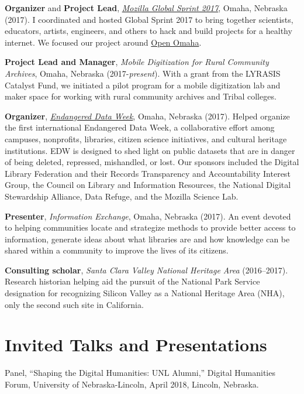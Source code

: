 \textbf{Organizer} and \textbf{Project Lead},
\emph{\href{https://mozilla.github.io/global-sprint/}{Mozilla Global
Sprint 2017}}, Omaha, Nebraska (2017). I coordinated and hosted Global
Sprint 2017 to bring together scientists, educators, artists, engineers,
and others to hack and build projects for a healthy internet. We focused
our project around \href{http://github.com/open-omaha/}{Open Omaha}.

\textbf{Project Lead and Manager}, \emph{Mobile Digitization for Rural
Community Archives}, Omaha, Nebraska (2017-\emph{present}). With a grant
from the LYRASIS Catalyst Fund, we initiated a pilot program for a
mobile digitization lab and maker space for working with rural community
archives and Tribal colleges.

\textbf{Organizer},
\emph{\href{http://endangereddataweek.org}{Endangered Data Week}},
Omaha, Nebraska (2017). Helped organize the first international
Endangered Data Week, a collaborative effort among campuses, nonprofits,
libraries, citizen science initiatives, and cultural heritage
institutions. EDW is designed to shed light on public datasets that are
in danger of being deleted, repressed, mishandled, or lost. Our sponsors
included the Digital Library Federation and their Records Transparency
and Accountability Interest Group, the Council on Library and
Information Resources, the National Digital Stewardship Alliance, Data
Refuge, and the Mozilla Science Lab.

\textbf{Presenter}, \emph{Information Exchange}, Omaha, Nebraska (2017).
An event devoted to helping communities locate and strategize methods to
provide better access to information, generate ideas about what
libraries are and how knowledge can be shared within a community to
improve the lives of its citizens.

\textbf{Consulting scholar}, \emph{Santa Clara Valley National Heritage
Area} (2016--2017). Research historian helping aid the pursuit of the
National Park Service designation for recognizing Silicon Valley as a
National Heritage Area (NHA), only the second such site in California.

\section{Invited Talks and
Presentations}\label{invited-talks-and-presentations}

Panel, ``Shaping the Digital Humanities: UNL Alumni,'' Digital
Humanities Forum, University of Nebraska-Lincoln, April 2018, Lincoln,
Nebraska.

